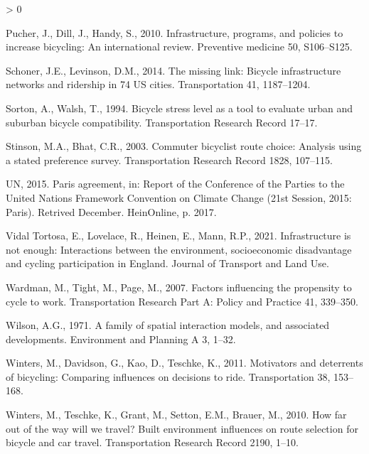 \documentclass[
]{article}
\newlength{\cslhangindent}
\newenvironment{CSLReferences}[2] %
 {%
  \setlength{\parindent}{0pt}
  \ifodd #1 \everypar{\setlength{\hangindent}{\cslhangindent}}\ignorespaces\fi
  \ifnum #2 > 0
  \setlength{\parskip}{#2\baselineskip}
  \fi
 }%
 {}
\begin{document}
\begin{CSLReferences}{1}{0}
\leavevmode\hypertarget{ref-pucher2010infrastructure}{}%
Pucher, J., Dill, J., Handy, S., 2010. Infrastructure, programs, and policies to increase bicycling: An international review. Preventive medicine 50, S106--S125.

\leavevmode\hypertarget{ref-schoner2014missing}{}%
Schoner, J.E., Levinson, D.M., 2014. The missing link: Bicycle infrastructure networks and ridership in 74 US cities. Transportation 41, 1187--1204.

\leavevmode\hypertarget{ref-sorton1994bicycle}{}%
Sorton, A., Walsh, T., 1994. Bicycle stress level as a tool to evaluate urban and suburban bicycle compatibility. Transportation Research Record 17--17.

\leavevmode\hypertarget{ref-stinson2003commuter}{}%
Stinson, M.A., Bhat, C.R., 2003. Commuter bicyclist route choice: Analysis using a stated preference survey. Transportation Research Record 1828, 107--115.

\leavevmode\hypertarget{ref-agreement2015paris}{}%
UN, 2015. Paris agreement, in: Report of the Conference of the Parties to the United Nations Framework Convention on Climate Change (21st Session, 2015: Paris). Retrived December. HeinOnline, p. 2017.

\leavevmode\hypertarget{ref-vidaltortosa_infrastructure_2020}{}%
Vidal Tortosa, E., Lovelace, R., Heinen, E., Mann, R.P., 2021. Infrastructure is not enough: Interactions between the environment, socioeconomic disadvantage and cycling participation in {England}. Journal of Transport and Land Use.

\leavevmode\hypertarget{ref-wardman2007factors}{}%
Wardman, M., Tight, M., Page, M., 2007. Factors influencing the propensity to cycle to work. Transportation Research Part A: Policy and Practice 41, 339--350.

\leavevmode\hypertarget{ref-wilson1971family}{}%
Wilson, A.G., 1971. A family of spatial interaction models, and associated developments. Environment and Planning A 3, 1--32.

\leavevmode\hypertarget{ref-winters2011motivators}{}%
Winters, M., Davidson, G., Kao, D., Teschke, K., 2011. Motivators and deterrents of bicycling: Comparing influences on decisions to ride. Transportation 38, 153--168.

\leavevmode\hypertarget{ref-winters2010far}{}%
Winters, M., Teschke, K., Grant, M., Setton, E.M., Brauer, M., 2010. How far out of the way will we travel? Built environment influences on route selection for bicycle and car travel. Transportation Research Record 2190, 1--10.

\end{CSLReferences}
\end{document}
